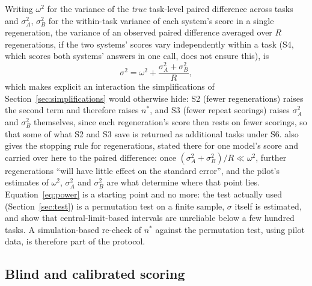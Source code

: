 \documentclass[11pt]{article}
\begin{document}
Writing $\omega^2$ for the variance of the \emph{true} task-level paired
difference across tasks and $\sigma_A^2$, $\sigma_B^2$ for the within-task variance of each
system's score in a single regeneration, the variance of an observed paired difference
averaged over $R$ regenerations, if the two systems' scores vary independently within a task (S4, which scores both systems' answers in one call, does not ensure this), is
\begin{equation}
\sigma^2 = \omega^2 + \frac{\sigma_A^2 + \sigma_B^2}{R},
\label{eq:variance-decomposition}
\end{equation}
which makes explicit an interaction the simplifications of
Section~\ref{sec:simplifications} would otherwise hide: S2 (fewer regenerations) raises the
second term and therefore raises $n^*$, and S3 (fewer repeat scorings) raises $\sigma_A^2$ and $\sigma_B^2$ themselves, since each regeneration's score then rests on fewer scorings, so that some of what S2 and S3 save is
returned as additional tasks under S6. \citet{miller2024errorbars} also gives the stopping
rule for regenerations, stated there for one model's score and carried over here to the paired difference: once $(\sigma_A^2 + \sigma_B^2)/R \ll \omega^2$, further
regenerations ``will have little effect on the standard error'', and the pilot's estimates
of $\omega^2$, $\sigma_A^2$ and $\sigma_B^2$ are what determine where that point lies. Equation~\ref{eq:power} is a starting point and no more: the test actually used
(Section~\ref{sec:test}) is a permutation test on a finite sample, $\sigma$ itself is
estimated, and \citet{bowyer2025clt} show that central-limit-based intervals are
unreliable below a few hundred tasks. A simulation-based re-check of $n^*$ against the
permutation test, using pilot data, is therefore part of the protocol.

\subsection{Blind and calibrated scoring}
\label{sec:calibration}
\end{document}
